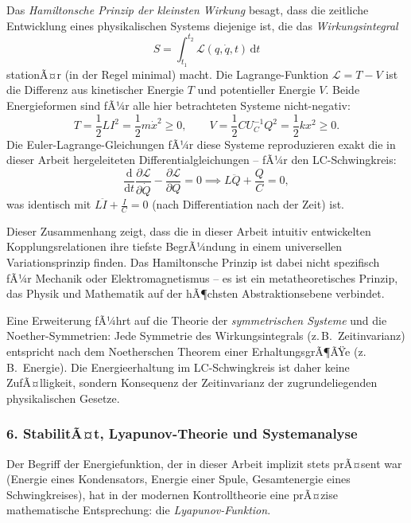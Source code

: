 ﻿\documentclass[12pt, a4paper]{article}
\begin{document}
	Das \textit{Hamiltonsche Prinzip der kleinsten Wirkung} besagt, dass die zeitliche Entwicklung eines physikalischen Systems diejenige ist, die das \textit{Wirkungsintegral}
	\begin{equation}
		S = \int_{t_1}^{t_2} \mathcal{L}(q, \dot{q}, t)\,\mathrm{d}t
	\end{equation}
	stationÃ¤r (in der Regel minimal) macht. Die Lagrange-Funktion $\mathcal{L} = T - V$ ist die Differenz aus kinetischer Energie $T$ und potentieller Energie $V$. Beide Energieformen sind fÃ¼r alle hier betrachteten Systeme nicht-negativ:
	\begin{equation}
		T = \frac{1}{2}LI^2 = \frac{1}{2}m\dot{x}^2 \geq 0, \qquad V = \frac{1}{2}CU_C^{-1}Q^2 = \frac{1}{2}kx^2 \geq 0.
	\end{equation}
	Die Euler-Lagrange-Gleichungen fÃ¼r diese Systeme reproduzieren exakt die in dieser Arbeit hergeleiteten Differentialgleichungen -- fÃ¼r den LC-Schwingkreis:
	\begin{equation}
		\frac{\mathrm{d}}{\mathrm{d}t}\frac{\partial \mathcal{L}}{\partial \dot{Q}} - \frac{\partial \mathcal{L}}{\partial Q} = 0 \implies L\ddot{Q} + \frac{Q}{C} = 0,
	\end{equation}
	was identisch mit $L\ddot{I} + \frac{I}{C} = 0$ (nach Differentiation nach der Zeit) ist.

	Dieser Zusammenhang zeigt, dass die in dieser Arbeit intuitiv entwickelten Kopplungsrelationen ihre tiefste BegrÃ¼ndung in einem universellen Variationsprinzip finden. Das Hamiltonsche Prinzip ist dabei nicht spezifisch fÃ¼r Mechanik oder Elektromagnetismus -- es ist ein metatheoretisches Prinzip, das Physik und Mathematik auf der hÃ¶chsten Abstraktionsebene verbindet.

	Eine Erweiterung fÃ¼hrt auf die Theorie der \textit{symmetrischen Systeme} und die Noether-Symmetrien: Jede Symmetrie des Wirkungsintegrals (z.\,B.\ Zeitinvarianz) entspricht nach dem Noetherschen Theorem einer ErhaltungsgrÃ¶ÃŸe (z.\,B.\ Energie). Die Energieerhaltung im LC-Schwingkreis ist daher keine ZufÃ¤lligkeit, sondern Konsequenz der Zeitinvarianz der zugrundeliegenden physikalischen Gesetze.

	\subsubsection*{6. \quad StabilitÃ¤t, Lyapunov-Theorie und Systemanalyse}

	Der Begriff der Energiefunktion, der in dieser Arbeit implizit stets prÃ¤sent war (Energie eines Kondensators, Energie einer Spule, Gesamtenergie eines Schwingkreises), hat in der modernen Kontrolltheorie eine prÃ¤zise mathematische Entsprechung: die \textit{Lyapunov-Funktion}.
\end{document}
